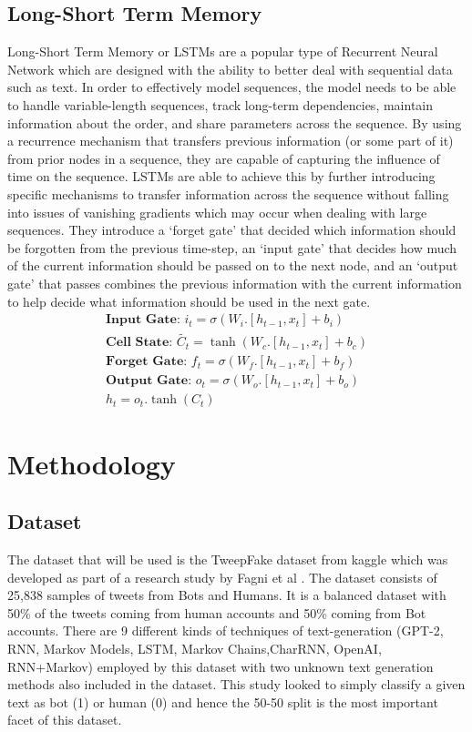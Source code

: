 \documentclass[12pt]{article}
\begin{document}
\subsection{Long-Short Term Memory}
Long-Short Term Memory or LSTMs are a popular type of Recurrent Neural Network which are designed with the ability to better deal with sequential data such as text. In order to effectively model sequences, the model needs to be able to handle variable-length sequences, track long-term dependencies, maintain information about the order, and share parameters across the sequence. By using a recurrence mechanism that transfers previous information (or some part of it) from prior nodes in a sequence, they are capable of capturing the influence of time on the sequence. LSTMs are able to achieve this by further introducing specific mechanisms to transfer information across the sequence without falling into issues of vanishing gradients which may occur when dealing with large sequences. They introduce a ‘forget gate’ that decided which information should be forgotten from the previous time-step, an ‘input gate’ that decides how much of the current information should be passed on to the next node,  and an ‘output gate’ that passes combines the previous information with the current information to help decide what information should be used in the next gate.
\begin{equation}
\begin{aligned}
	\textbf{Input Gate: }i_{t} = \sigma(W_i.[h_{t-1},x_t]+b_i) \\
	\textbf{Cell State: }\tilde{C_{t}} = \tanh(W_c.[h_{t-1},x_t]+b_c)\\
	\textbf{Forget Gate: }f_{t} = \sigma(W_f.[h_{t-1},x_t]+b_f)\\
	\textbf{Output Gate: }o_{t} = \sigma(W_o.[h_{t-1},x_t]+b_o)\\
				h_{t} = o_t.\tanh(C_t)
\end{aligned}
\end{equation}


\section{Methodology}
\subsection{Dataset}
The dataset that will be used is the TweepFake dataset from kaggle \cite{noauthor_tweepfake_nodate} which was developed as part of a research study by Fagni et al \cite{fagni_tweepfake_2021}. The dataset consists of 25,838 samples of tweets from Bots and Humans. It is a balanced dataset with 50\% of the tweets coming from human accounts and 50\% coming from Bot accounts.  There are 9 different kinds of techniques of text-generation (GPT-2, RNN, Markov Models, LSTM, Markov Chains,CharRNN, OpenAI, RNN+Markov) employed by this dataset with two unknown text generation methods also included in the dataset. This study looked to simply classify a given text as bot (1) or human (0) and hence the 50-50 split is the most important facet of this dataset. 
\end{document}
